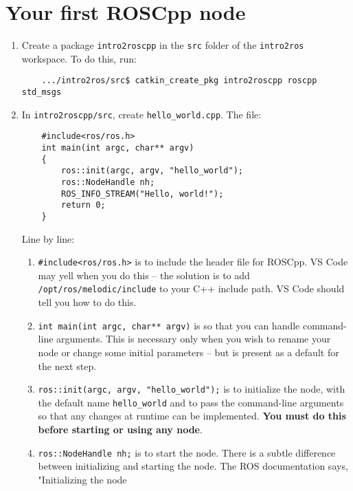 \documentclass{article}
\begin{document}
    \section{Your first ROSCpp node}
        \begin{enumerate}
            \item Create a package \texttt{intro2roscpp} in the \texttt{src} folder of 
            the \texttt{intro2ros} workspace. To do this, run:
            \begin{verbatim}
    .../intro2ros/src$ catkin_create_pkg intro2roscpp roscpp std_msgs
            \end{verbatim}
            \item In \texttt{intro2roscpp/src}, create \texttt{hello\_world.cpp}. The file:
            \begin{verbatim}
    #include<ros/ros.h>
    int main(int argc, char** argv)
    {
        ros::init(argc, argv, "hello_world");
        ros::NodeHandle nh;
        ROS_INFO_STREAM("Hello, world!");
        return 0;
    }
            \end{verbatim}
            Line by line:
            \begin{enumerate}
                \item \texttt{#include<ros/ros.h>} is to include the header file for 
                ROSCpp. VS Code may yell when you do this -- the solution is to add 
                \texttt{/opt/ros/melodic/include} to your C++ include path. VS Code should tell 
                you how to do this.
                \item \texttt{int main(int argc, char** argv)} is so that you can handle 
                command-line arguments. This is necessary only when you wish to rename your node or 
                change some initial parameters -- but is present as a default for the next step.
                \item \texttt{ros::init(argc, argv, "hello_world");} is to initialize the 
                node, with the default name \texttt{hello\_world} and to pass the command-line arguments 
                so that any changes at runtime can be implemented. \textbf{You must do this before starting 
                or using any node}.
                \item \texttt{ros::NodeHandle nh;} is to start the node. There is a subtle difference 
                between initializing and starting the node. The ROS documentation says, "Initializing the node

\end{enumerate}
\end{enumerate}
\end{document}
